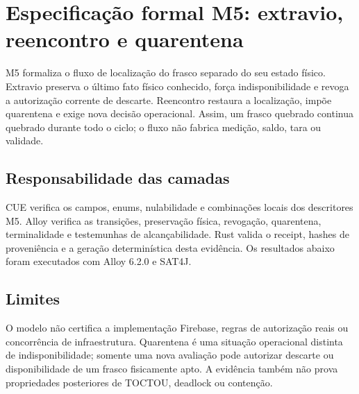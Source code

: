 \clearpage
\section{Especificação formal M5: extravio, reencontro e quarentena}
\label{sec:formal-m5}

M5 formaliza o fluxo de localização do frasco separado do seu estado físico.
Extravio preserva o último fato físico conhecido, força indisponibilidade e
revoga a autorização corrente de descarte. Reencontro restaura a localização,
impõe quarentena e exige nova decisão operacional. Assim, um frasco quebrado
continua quebrado durante todo o ciclo; o fluxo não fabrica medição, saldo,
tara ou validade.

\subsection*{Responsabilidade das camadas}
CUE verifica os campos, enums, nulabilidade e combinações locais dos descritores
M5. Alloy verifica as transições, preservação física, revogação, quarentena,
terminalidade e testemunhas de alcançabilidade. Rust valida o receipt, hashes de
proveniência e a geração determinística desta evidência. Os resultados abaixo
foram executados com Alloy 6.2.0 e SAT4J.

\begingroup\small\raggedright


\par\endgroup

\subsection*{Limites}
O modelo não certifica a implementação Firebase, regras de autorização reais ou
concorrência de infraestrutura. Quarentena é uma situação operacional distinta
de indisponibilidade; somente uma nova avaliação pode autorizar descarte ou
disponibilidade de um frasco fisicamente apto. A evidência também não prova
propriedades posteriores de TOCTOU, deadlock ou contenção.
